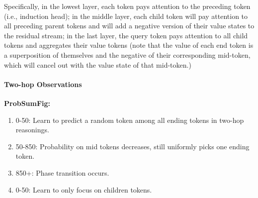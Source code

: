 Specifically, in the lowest layer, each token pays attention to the preceding token (i.e., induction head); in the middle layer, each child token will pay attention to all preceding parent tokens and will add a negative version of their value states to the residual stream; in the last layer, the query token pays attention to all child tokens and aggregates their value tokens (note that the value of each end token is a superposition of themselves and the negative of their corresponding mid-token, which will cancel out with the value state of that mid-token.) 





\paragraph{Two-hop Observations}

\textbf{ProbSumFig:}
\begin{enumerate}
    \item 0-50: Learn to predict a random token among all ending tokens in two-hop reasonings.
    \item 50-850: Probability on mid tokens decreases, still uniformly picks one ending token.
    \item 850+: Phase transition occurs.
    \item 0-50: Learn to only focus on children tokens.
\end{enumerate}

